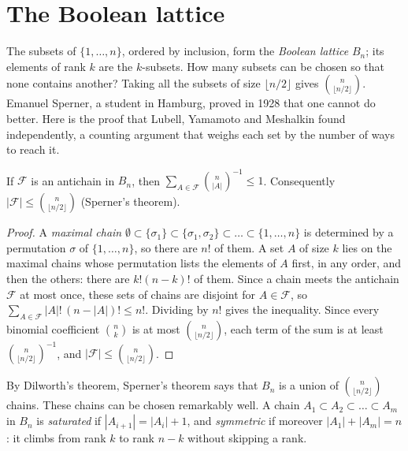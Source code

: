 \section{The Boolean lattice}

The subsets of $\{1,\dots,n\}$, ordered by inclusion, form the \emph{Boolean lattice} $B_n$; its elements of rank $k$ are the $k$-subsets. How
many subsets can be chosen so that none contains another? Taking all the subsets of size $\lfloor n/2\rfloor$ gives $\binom n{\lfloor n/2\rfloor}$. Emanuel
Sperner, a student in Hamburg, proved in 1928 that one cannot do better. Here is the proof that Lubell, Yamamoto and
Meshalkin found independently, a counting argument that weighs each set by the number of ways to reach it.

\begin{theorem}\label{thm:lym}
If $\mathcal F$ is an antichain in $B_n$, then $\displaystyle\sum_{A\in\mathcal F}\binom n{|A|}^{-1}\le1$. Consequently $|\mathcal F|\le\binom n{\lfloor n/2\rfloor}$ (Sperner's theorem).
\end{theorem}
\begin{proof}
A \emph{maximal chain} $\emptyset\subset\{\sigma_1\}\subset\{\sigma_1,\sigma_2\}\subset\dots\subset\{1,\dots,n\}$ is determined by a permutation $\sigma$ of $\{1,\dots,n\}$, so there are $n!$ of them. A set $A$
of size $k$ lies on the maximal chains whose permutation lists the elements of $A$ first, in any order, and then the others:
there are $k!(n-k)!$ of them. Since a chain meets the antichain $\mathcal F$ at most once, these sets of chains are disjoint for $A\in\mathcal F$, so
$\sum_{A\in\mathcal F}|A|!\,(n-|A|)!\le n!$. Dividing by $n!$ gives the inequality. Since every binomial coefficient $\binom nk$ is at most $\binom n{\lfloor n/2\rfloor}$, each term of
the sum is at least $\binom n{\lfloor n/2\rfloor}^{-1}$, and $|\mathcal F|\le\binom n{\lfloor n/2\rfloor}$.
\end{proof}

By Dilworth's theorem, Sperner's theorem says that $B_n$ is a union of $\binom n{\lfloor n/2\rfloor}$ chains. These chains can be chosen
remarkably well. A chain $A_1\subset A_2\subset\dots\subset A_m$ in $B_n$ is \emph{saturated} if $|A_{i+1}|=|A_i|+1$, and \emph{symmetric} if moreover $|A_1|+|A_m|=n$: it climbs
from rank $k$ to rank $n-k$ without skipping a rank.

